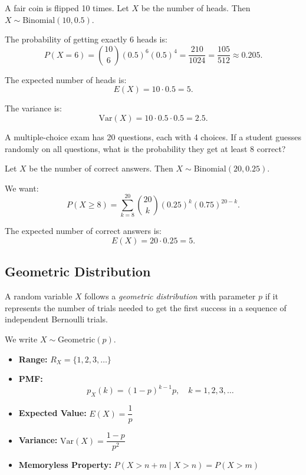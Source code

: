 \begin{eg}
A fair coin is flipped 10 times. Let \(X\) be the number of heads. Then \(X \sim \text{Binomial}(10, 0.5)\).

The probability of getting exactly 6 heads is:
\[
P(X = 6) = \binom{10}{6} (0.5)^6 (0.5)^4 = \frac{210}{1024} = \frac{105}{512} \approx 0.205.
\]

The expected number of heads is:
\[
E(X) = 10 \cdot 0.5 = 5.
\]

The variance is:
\[
\text{Var}(X) = 10 \cdot 0.5 \cdot 0.5 = 2.5.
\]
\end{eg}

\begin{eg}
A multiple-choice exam has 20 questions, each with 4 choices. If a student guesses randomly on all questions, what is the probability they get at least 8 correct?

Let \(X\) be the number of correct answers. Then \(X \sim \text{Binomial}(20, 0.25)\).

We want:
\[
P(X \ge 8) = \sum_{k=8}^{20} \binom{20}{k} (0.25)^k (0.75)^{20-k}.
\]

The expected number of correct answers is:
\[
E(X) = 20 \cdot 0.25 = 5.
\]
\end{eg}

\subsection{Geometric Distribution}

\begin{definition}
A random variable \(X\) follows a \emph{geometric distribution} with parameter \(p\) if it represents the number of trials needed to get the first success in a sequence of independent Bernoulli trials.

We write \(X \sim \text{Geometric}(p)\).
\end{definition}

\begin{itemize}
    \item \textbf{Range:} \(R_X = \{1, 2, 3, \ldots\}\)
    
    \item \textbf{PMF:}
    \[
    p_X(k) = (1-p)^{k-1} p, \quad k = 1, 2, 3, \ldots
    \]
    
    \item \textbf{Expected Value:} \(E(X) = \dfrac{1}{p}\)
    
    \item \textbf{Variance:} \(\text{Var}(X) = \dfrac{1-p}{p^2}\)
    
    \item \textbf{Memoryless Property:} \(P(X > n+m \mid X > n) = P(X > m)\)
\end{itemize}

